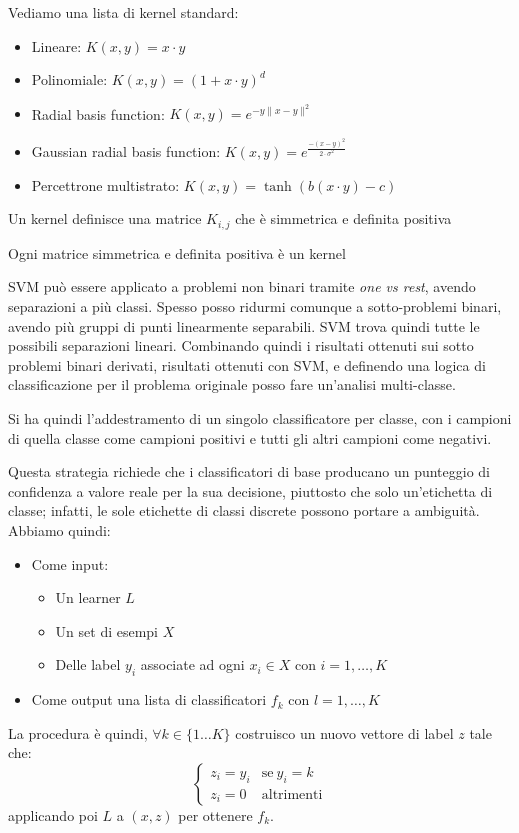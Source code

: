 Vediamo una lista di kernel standard:
\begin{itemize}
    \item Lineare: $K(x, y) = x \cdot y$
    \item Polinomiale: $K(x, y) = (1 + x \cdot y)^d$
    \item Radial basis function: $K(x, y) = e^{-y \| x - y\|^2}$
    \item Gaussian radial basis function: $K(x, y) = e^{\frac{-(x-y)^2}{2 \cdot \sigma^2}}$
    \item Percettrone multistrato: $K(x, y) = \tanh(b(x \cdot y) - c)$
\end{itemize}
\begin{teorema}
    Un kernel definisce una matrice $K_{i,j}$ che è simmetrica e definita positiva
\end{teorema}
\begin{teorema}
    Ogni matrice simmetrica e definita positiva è un kernel
\end{teorema}

SVM può essere applicato a problemi non binari tramite \textit{one vs rest},
avendo separazioni a più classi. Spesso posso ridurmi comunque a sotto-problemi
binari, avendo più gruppi di punti linearmente separabili. SVM trova quindi tutte
le possibili separazioni lineari. Combinando quindi i risultati ottenuti sui sotto
problemi binari derivati, risultati ottenuti con SVM, e definendo una logica di
classificazione per il problema originale posso fare un'analisi multi-classe.

Si ha quindi l'addestramento di un singolo classificatore per classe, con i campioni
di quella classe come campioni positivi e tutti gli altri campioni come negativi.

Questa strategia richiede che i classificatori di base producano un punteggio di
confidenza a valore reale per la sua decisione, piuttosto che solo un'etichetta
di classe; infatti, le sole etichette di classi discrete possono portare a ambiguità.
Abbiamo quindi:
\begin{itemize}
    \item Come input:
          \begin{itemize}
              \item Un learner $L$
              \item Un set di esempi $X$
              \item Delle label $y_i$ associate ad ogni $x_i \in X$ con $i = 1, \dots, K$
          \end{itemize}
    \item Come output una lista di classificatori $f_k$ con $l = 1,\dots, K$
\end{itemize}
La procedura è quindi, $\forall k \in \{1 \dots K\}$ costruisco un nuovo vettore
di label $z$ tale che:
\begin{equation}
    \begin{cases}
        z_i = y_i & \text{se} \ y_i = k \\
        z_i = 0   & \text{altrimenti}
    \end{cases}
\end{equation}
applicando poi $L$ a $(x, z)$ per ottenere $f_k$.

